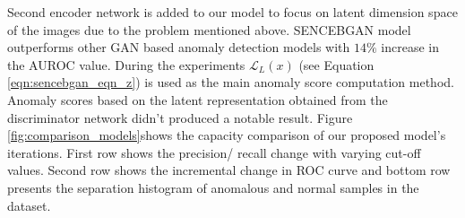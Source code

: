 Second encoder network is added to our model to focus on latent dimension space of the images due to
the problem mentioned above. SENCEBGAN model outperforms other GAN based anomaly detection models
with $14\%$ increase in the AUROC value. During the experiments $\mathcal{L}_{L} (x)$ (see Equation
\ref{eqn:sencebgan_eqn_z}) is used as the main anomaly score computation method. Anomaly scores
based on the latent representation obtained from the discriminator network didn't produced a notable
result. Figure \ref{fig:comparison_models}shows the capacity comparison of our proposed model's
iterations. First row shows the precision/ recall change with varying cut-off values. Second row
shows the incremental change in ROC curve and bottom row presents the separation histogram of
anomalous and normal samples in the dataset. 


\endgroup

